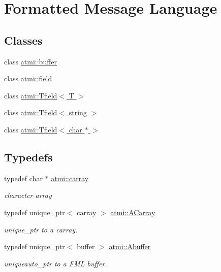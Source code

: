 \hypertarget{group__fml}{\section{Formatted Message Language}
\label{group__fml}
}
\subsection*{Classes}
\begin{DoxyCompactItemize}
\item 
class \hyperlink{classatmi_1_1buffer}{atmi\+::buffer}
\item 
class \hyperlink{classatmi_1_1field}{atmi\+::field}
\item 
class \hyperlink{classatmi_1_1_tfield}{atmi\+::\+Tfield$<$ T $>$}
\item 
class \hyperlink{classatmi_1_1_tfield_3_01string_01_4}{atmi\+::\+Tfield$<$ string $>$}
\item 
class \hyperlink{classatmi_1_1_tfield_3_01char_01_5_01_4}{atmi\+::\+Tfield$<$ char $\ast$ $>$}
\end{DoxyCompactItemize}
\subsection*{Typedefs}
\begin{DoxyCompactItemize}
\item 
\hypertarget{group__fml_ga8b57f9a4e2453d8e5d82ac0016e35e87}{typedef char $\ast$ \hyperlink{group__fml_ga8b57f9a4e2453d8e5d82ac0016e35e87}{atmi\+::carray}}\label{group__fml_ga8b57f9a4e2453d8e5d82ac0016e35e87}

\begin{DoxyCompactList}\small\item\em character array \end{DoxyCompactList}\item 
\hypertarget{group__fml_ga374230d2a2355a879f42c829eb2d70ff}{typedef unique\+\_\+ptr$<$ carray $>$ \hyperlink{group__fml_ga374230d2a2355a879f42c829eb2d70ff}{atmi\+::\+A\+Carray}}\label{group__fml_ga374230d2a2355a879f42c829eb2d70ff}

\begin{DoxyCompactList}\small\item\em unique\+\_\+ptr to a carray. \end{DoxyCompactList}\item 
\hypertarget{group__fml_ga268bae34ffaa2c2e72fabbcb54841934}{typedef unique\+\_\+ptr$<$ buffer $>$ \hyperlink{group__fml_ga268bae34ffaa2c2e72fabbcb54841934}{atmi\+::\+Abuffer}}\label{group__fml_ga268bae34ffaa2c2e72fabbcb54841934}

\begin{DoxyCompactList}\small\item\em uniqueauto\+\_\+ptr to a F\+M\+L buffer. \end{DoxyCompactList}\end{DoxyCompactItemize}
